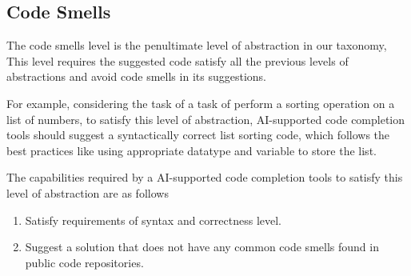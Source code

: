 \subsection{Code Smells}
The code smells level is the penultimate level of abstraction in our taxonomy, This level requires the suggested code satisfy all the previous levels of abstractions and avoid code smells in its suggestions.

For example, considering the task of  a task of perform a sorting operation on a list of numbers, to satisfy this level of abstraction, AI-supported code completion tools should
suggest a syntactically correct list sorting code, which follows the best practices like using appropriate datatype and variable to store the list.

The capabilities required by a AI-supported code completion tools to satisfy this
level of abstraction are as follows
\begin{enumerate}
    \item Satisfy requirements of syntax and correctness level.
    \item Suggest a solution that does not have any common code smells found in public code repositories.
\end{enumerate}
